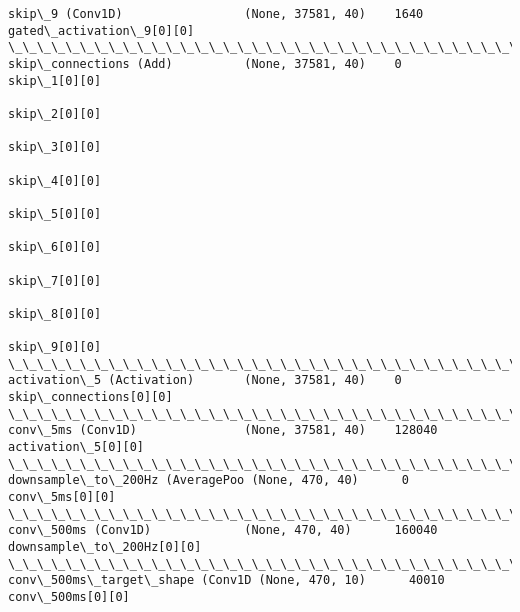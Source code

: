 \documentclass[11pt]{article}
\begin{document}
\begin{Verbatim}[commandchars=\\\{\}]
skip\_9 (Conv1D)                 (None, 37581, 40)    1640        gated\_activation\_9[0][0]         
\_\_\_\_\_\_\_\_\_\_\_\_\_\_\_\_\_\_\_\_\_\_\_\_\_\_\_\_\_\_\_\_\_\_\_\_\_\_\_\_\_\_\_\_\_\_\_\_\_\_\_\_\_\_\_\_\_\_\_\_\_\_\_\_\_\_\_\_\_\_\_\_\_\_\_\_\_\_\_\_\_\_\_\_\_\_\_\_\_\_\_\_\_\_\_\_\_\_
skip\_connections (Add)          (None, 37581, 40)    0           skip\_1[0][0]                     
                                                                 skip\_2[0][0]                     
                                                                 skip\_3[0][0]                     
                                                                 skip\_4[0][0]                     
                                                                 skip\_5[0][0]                     
                                                                 skip\_6[0][0]                     
                                                                 skip\_7[0][0]                     
                                                                 skip\_8[0][0]                     
                                                                 skip\_9[0][0]                     
\_\_\_\_\_\_\_\_\_\_\_\_\_\_\_\_\_\_\_\_\_\_\_\_\_\_\_\_\_\_\_\_\_\_\_\_\_\_\_\_\_\_\_\_\_\_\_\_\_\_\_\_\_\_\_\_\_\_\_\_\_\_\_\_\_\_\_\_\_\_\_\_\_\_\_\_\_\_\_\_\_\_\_\_\_\_\_\_\_\_\_\_\_\_\_\_\_\_
activation\_5 (Activation)       (None, 37581, 40)    0           skip\_connections[0][0]           
\_\_\_\_\_\_\_\_\_\_\_\_\_\_\_\_\_\_\_\_\_\_\_\_\_\_\_\_\_\_\_\_\_\_\_\_\_\_\_\_\_\_\_\_\_\_\_\_\_\_\_\_\_\_\_\_\_\_\_\_\_\_\_\_\_\_\_\_\_\_\_\_\_\_\_\_\_\_\_\_\_\_\_\_\_\_\_\_\_\_\_\_\_\_\_\_\_\_
conv\_5ms (Conv1D)               (None, 37581, 40)    128040      activation\_5[0][0]               
\_\_\_\_\_\_\_\_\_\_\_\_\_\_\_\_\_\_\_\_\_\_\_\_\_\_\_\_\_\_\_\_\_\_\_\_\_\_\_\_\_\_\_\_\_\_\_\_\_\_\_\_\_\_\_\_\_\_\_\_\_\_\_\_\_\_\_\_\_\_\_\_\_\_\_\_\_\_\_\_\_\_\_\_\_\_\_\_\_\_\_\_\_\_\_\_\_\_
downsample\_to\_200Hz (AveragePoo (None, 470, 40)      0           conv\_5ms[0][0]                   
\_\_\_\_\_\_\_\_\_\_\_\_\_\_\_\_\_\_\_\_\_\_\_\_\_\_\_\_\_\_\_\_\_\_\_\_\_\_\_\_\_\_\_\_\_\_\_\_\_\_\_\_\_\_\_\_\_\_\_\_\_\_\_\_\_\_\_\_\_\_\_\_\_\_\_\_\_\_\_\_\_\_\_\_\_\_\_\_\_\_\_\_\_\_\_\_\_\_
conv\_500ms (Conv1D)             (None, 470, 40)      160040      downsample\_to\_200Hz[0][0]        
\_\_\_\_\_\_\_\_\_\_\_\_\_\_\_\_\_\_\_\_\_\_\_\_\_\_\_\_\_\_\_\_\_\_\_\_\_\_\_\_\_\_\_\_\_\_\_\_\_\_\_\_\_\_\_\_\_\_\_\_\_\_\_\_\_\_\_\_\_\_\_\_\_\_\_\_\_\_\_\_\_\_\_\_\_\_\_\_\_\_\_\_\_\_\_\_\_\_
conv\_500ms\_target\_shape (Conv1D (None, 470, 10)      40010       conv\_500ms[0][0]                 

\end{Verbatim}
\end{document}
